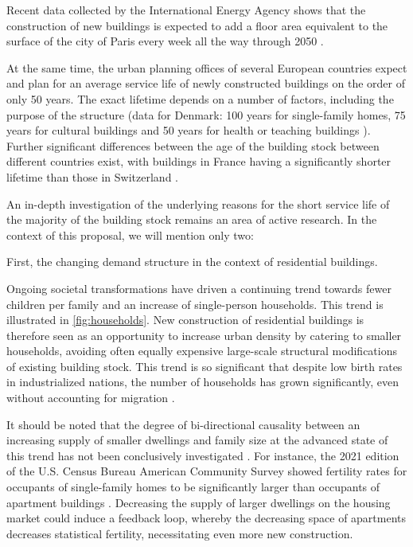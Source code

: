 \documentclass{article}
\begin{document}
\begin{multicols}{2}

Recent data collected by the International Energy Agency shows that the construction of new buildings is expected to add a floor area equivalent to the surface of the city of Paris every week all the way through 2050 \cite[Sec. 3.7]{cozzi_net_2021}.

At the same time, the urban planning offices of several European countries expect and plan for an average service life of newly constructed buildings on the order of only 50 years. The exact lifetime depends on a number of factors, including the purpose of the structure (data for Denmark: 100 years for single-family homes, 75 years for cultural buildings and 50 years for health or teaching buildings \cite{andersen_lifespan_2023}). Further significant differences between the age of the building stock between different countries exist, with buildings in France having a significantly shorter lifetime \cite{noauthor_value_2013} than those in Switzerland \cite{kornmann_service_2012}.

An in-depth investigation of the underlying reasons for the short service life of the majority of the building stock remains an area of active research. In the context of this proposal, we will mention only two:

First, the changing demand structure in the context of residential buildings.

Ongoing societal transformations have driven a continuing trend towards fewer children per family and an increase of single-person households. This trend is illustrated in \cref{fig:households}. New construction of residential buildings is therefore seen as an opportunity to increase urban density by catering to smaller households, avoiding often equally expensive large-scale structural modifications of existing building stock. This trend is so significant that despite low birth rates in industrialized nations, the number of households has grown significantly, even without accounting for migration \cite{noauthor_why_2014}.

It should be noted that the degree of bi-directional causality between an increasing supply of smaller dwellings and family size at the advanced state of this trend has not been conclusively investigated \cite{kulu_fertility_2007}. For instance, the 2021 edition of the U.S. Census Bureau American Community Survey showed fertility rates for occupants of single-family homes to be significantly larger than occupants of apartment buildings \cite{noauthor_american_2021}. Decreasing the supply of larger dwellings on the housing market could induce a feedback loop, whereby the decreasing space of apartments decreases statistical fertility, necessitating even more new construction.

\end{multicols}
\end{document}
